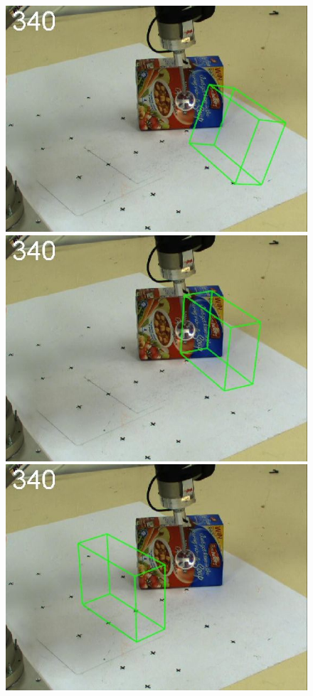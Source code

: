 \begin{figure}[t]
{\includegraphics[width=\imgCXwid]{./C1_1exp_87_5}
\includegraphics[width=\imgCXwid]{./C1_2exp_87_5}
\includegraphics[width=\imgCXwid]{./C1_LWPR1_87_5}
}


\end{figure}
